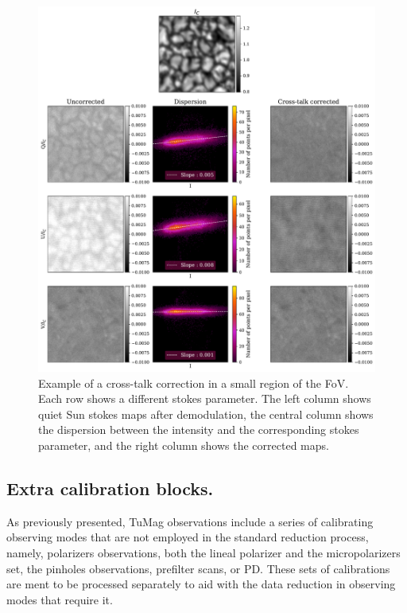 \begin{figure}
  \includegraphics[width=\textwidth]{figures/Pipeline/xtalk_example.pdf}
  \caption[Cross-talk correction.]{Example of a cross-talk correction in a small region of the FoV. Each row shows a different stokes parameter. The left column shows quiet Sun stokes maps after demodulation, the central column shows the dispersion between the intensity and the corresponding stokes parameter, and the right column shows the corrected maps. }
    \label{fig_pipeline: xtalk}
\end{figure}





\subsection{Extra calibration blocks.}

As previously presented, TuMag observations include a series of calibrating observing modes that are not employed in the standard reduction process, namely, polarizers observations, both the lineal polarizer and the micropolarizers set, the pinholes observations, prefilter scans, or PD. These sets of calibrations are ment to be processed separately to aid with the data reduction in observing modes that require it.

